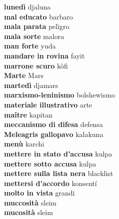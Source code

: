 \textbf{ lunedì  } djaluna \\
\textbf{ mal educato  } barbaro \\
\textbf{ mala parata  } peligro \\
\textbf{ mala sorte  } malora \\
\textbf{ man forte  } yuda \\
\textbf{ mandare in rovina  } fayit \\
\textbf{ marrone scuro  } kòfi \\
\textbf{ Marte  } Mars \\
\textbf{ martedì  } djamars \\
\textbf{ marxismo-leninismo  } bolshewismo \\
\textbf{ materiale illustrativo  } arte \\
\textbf{ maître  } kapitan \\
\textbf{ meccanismo di difesa  } defensa \\
\textbf{ Meleagris gallopavo  } kalakuna \\
\textbf{ menù  } karchi \\
\textbf{ mettere in stato d’accusa  } kulpa \\
\textbf{ mettere sotto accusa  } kulpa \\
\textbf{ mettere sulla lista nera  } blacklist \\
\textbf{ mettersi d’accordo  } konsentí \\
\textbf{ molto in vista  } grandi \\
\textbf{ muccosità  } sleim \\
\textbf{ mucosità  } sleim \\
